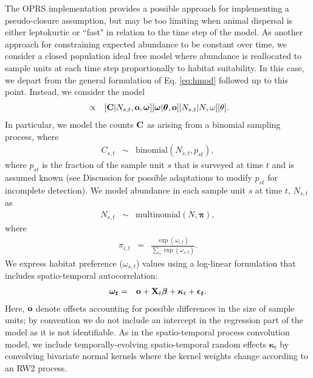 \documentclass[12pt,english]{article}
\begin{document}
\begin{spacing}{1.9}
The OPRS implementation provides a possible approach for implementing a pseudo-closure assumption, but may be too limiting when animal dispersal is either leptokurtic or ``fast" in relation to the time step of the model.  As another approach for constraining expected abundance to be constant over time, we consider a closed population
ideal free model where abundance is reallocated to sample units at each time step proportionally to habitat suitability.  In this case, we depart from the general formulation of Eq. \ref{eq:hmod} followed up to this point.  Instead, we consider the model
\begin{eqnarray}
  [N, N_{s,t}, \boldsymbol{\omega},\boldsymbol{\theta} | {\bf C},{\bf o},{\bf p}] & \propto & [{\bf C} | N_{s,t}, {\bf o}, \boldsymbol{\omega}] [\boldsymbol{\omega} | \boldsymbol{\theta},{\bf o}] [N_{s,t}|N,\omega] [\theta].
  \label{eq:cpif-post}
\end{eqnarray}
In particular, we model the counts ${\bf C}$ as arising from a binomial sampling process, where
\begin{eqnarray*}
  C_{s,t} & \sim & \textrm{binomial}(N_{s,t}, p_{st}),
\end{eqnarray*}
where $p_{st}$ is the fraction of the sample unit $s$ that is surveyed at time $t$ and is assumed known (see Discussion for possible adaptations to modify $p_{st}$ for incomplete detection).
We model abundance in each sample unit $s$ at time $t$, $N_{s,t}$ as
\begin{eqnarray*}
  N_{s,t} & \sim & \textrm{multinomial}(N, \boldsymbol{\pi}),
\end{eqnarray*}
where
\begin{eqnarray*}
  \pi_{i,t} & = & \frac{\exp(\omega_{i,t})}{\sum_s \exp(\omega_{s,t})}.
\end{eqnarray*}
We express habitat preference ($\omega_{s,t}$) values using a log-linear formulation that includes spatio-temporal autocorrelation:
\begin{eqnarray*}
  \boldsymbol{\omega_t} & = & {\bf o} + {\bf X}_t \boldsymbol{\beta} + \boldsymbol{\kappa}_t + \boldsymbol{\epsilon_t}.
\end{eqnarray*}
Here, ${\bf o}$ denote offsets accounting for possible differences in the size of sample units; by convention we do not include an intercept in the regression part of the model as it is not identifiable.
As in the spatio-temporal process convolution model, we include temporally-evolving spatio-temporal random effects $\boldsymbol{\kappa}_t$ by convolving bivariate normal kernels where the kernel weights change according to an RW2 process.


\end{spacing}
\end{document}
